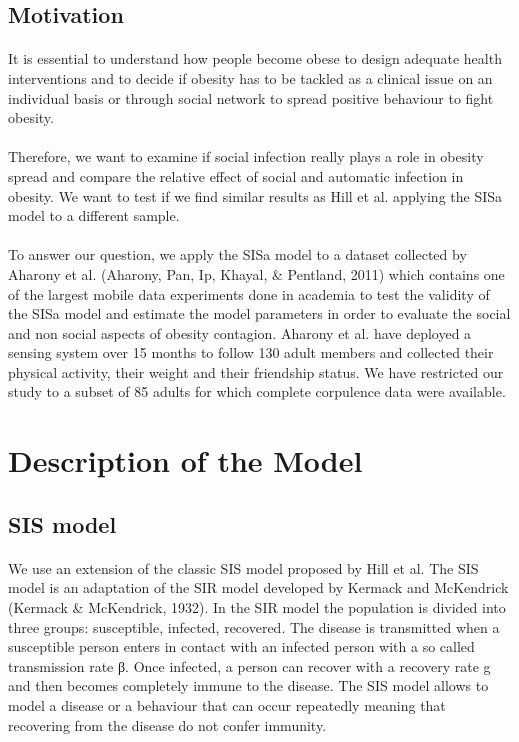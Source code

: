 \documentclass[11pt]{article}
\begin{document}
\subsection{Motivation}
\paragraph{}
It is essential to understand how people become obese to design adequate health interventions and to decide if obesity has to be tackled as a clinical issue on an individual basis or through social network to spread positive behaviour to fight obesity.

\paragraph{}
Therefore, we want to examine if social infection really plays a role in obesity spread and compare the  relative effect of social and automatic infection in obesity. We want to test if we find similar results as Hill et al. applying the SISa model to a different sample.

\paragraph{}
To answer our question, we apply the SISa model to a dataset collected by Aharony et al. (Aharony, Pan, Ip, Khayal, & Pentland, 2011) which contains one of the largest mobile data experiments done in academia to test the validity of the SISa model and estimate the model parameters in order to evaluate the social and non social aspects of obesity contagion. Aharony et al. have deployed a sensing system over 15 months to follow 130 adult members and collected their physical activity, their weight and their friendship status. We have restricted our study to a subset of 85 adults for which complete corpulence data were available.


\section{Description of the Model}

\subsection{SIS model}
\paragraph{}
We use an extension of the classic SIS model proposed by Hill et al. The SIS model is an adaptation of the SIR model developed by Kermack and McKendrick (Kermack & McKendrick, 1932). In the SIR model the population is divided into three groups: susceptible, infected, recovered. The disease is transmitted when a susceptible person enters in contact with an infected person with a so called transmission rate β. Once infected, a person can recover with a recovery rate g and then becomes completely immune to the disease. The SIS model allows to model a disease or a behaviour that can occur repeatedly meaning that recovering from the disease do not confer immunity.
\end{document}
